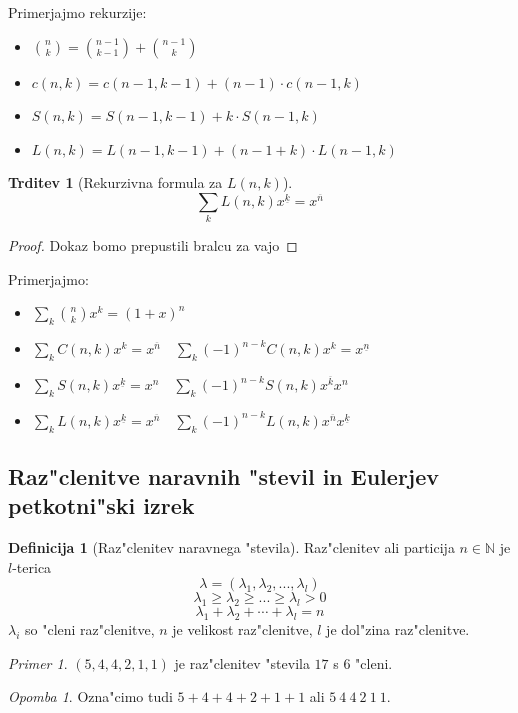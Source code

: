 \documentclass[a4paper,12pt]{article}
\theoremstyle{definition}
\newtheorem{defn}[counter]{Definicija}
\newtheorem{claim}[counter]{Trditev}
\theoremstyle{remark}
\newtheorem*{ex}{Primer}
\newtheorem*{rem}{Opomba}
\newcommand{\N}{\mathbb{N}}
\begin{document}
Primerjajmo rekurzije:
\begin{itemize}
    \item $\binom{n}{k} = \binom{n-1}{k-1} + \binom{n-1}{k}$
    \item $c(n,k) = c(n-1, k-1) + (n-1) \cdot c(n-1, k)$
    \item $S(n,k) = S(n-1, k-1) + k\cdot S(n-1, k)$
    \item $L(n,k) = L(n-1, k-1) + (n-1+k)\cdot L(n-1, k)$
\end{itemize}

\begin{claim}[Rekurzivna formula za $L(n, k)$]
    \[ \sum_k L(n,k)x^{\underline{k}} = x^{\overline{n}}\]
\end{claim}
\begin{proof}
    Dokaz bomo prepustili bralcu za vajo
\end{proof}

Primerjajmo:
\begin{itemize}
    \item $\sum_k \binom{n}{k}x^k = (1+x)^n$
    \item $\sum_k C(n,k)x^k = x^{\overline{n}} \quad \sum_k (-1)^{n-k}C(n,k)x^k = x^{\underline{n}}$
    \item $\sum_k S(n,k)x^{\underline{k}} = x^n \quad \sum_k (-1)^{n-k}S(n,k)x^{\overline{k}}x^n$
    \item $\sum_k L(n,k)x^{\underline{k}} = x^{\overline{{n}}} \quad \sum_k (-1)^{n-k}L(n,k)x^{\overline{{n}}}x^{\underline{k}}$
\end{itemize}


\subsection{Raz"clenitve naravnih "stevil in Eulerjev petkotni"ski izrek}
\begin{defn}[Raz"clenitev naravnega "stevila]
	Raz"clenitev ali particija $n \in \N$ je $l$-terica
	\[\lambda = (\lambda_1, \lambda_2, ..., \lambda_l)\]
	\[\lambda_1 \geqslant \lambda_2 \geqslant ... \geqslant \lambda_l > 0\]
	\[\lambda_1 + \lambda_2 + \cdots + \lambda_l = n\]
	$\lambda_i$ so "cleni raz"clenitve, $n$ je velikost raz"clenitve, $l$ je dol"zina raz"clenitve.
\end{defn}

\begin{ex}
	$(5, 4, 4, 2, 1, 1)$ je raz"clenitev "stevila $17$ s $6$ "cleni.
\end{ex}
\begin{rem}
	Ozna"cimo tudi $5 + 4 + 4 + 2 + 1 + 1$ ali $5\ 4\ 4\ 2\ 1\ 1$.
\end{rem}
\end{document}
